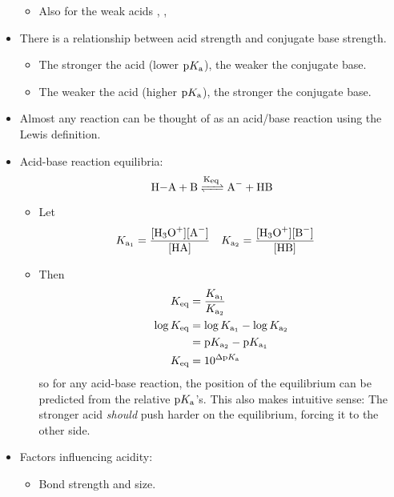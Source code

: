 \documentclass[../notes.tex]{subfiles}
\begin{document}
\begin{itemize}
    \begin{itemize}
        \item Also for the weak acids , , 
    \end{itemize}
    \item There is a relationship between acid strength and conjugate base strength.
    \begin{itemize}
        \item The stronger the acid (lower $\text{p}K_\text{a}$), the weaker the conjugate base.
        \item The weaker the acid (higher $\text{p}K_\text{a}$), the stronger the conjugate base.
    \end{itemize}
    \item Almost any reaction can be thought of as an acid/base reaction using the Lewis definition.
    \item Acid-base reaction equilibria:
    \begin{equation*}
        \ce{H-A + B <=>[K\textsubscript{eq}] A- + HB}
    \end{equation*}
    \begin{itemize}
        \item Let
        \begin{align*}
            K_{\text{a}_1} &= \frac{[\ce{H3O+}][\ce{A-}]}{[\ce{HA}]}&
            K_{\text{a}_2} &= \frac{[\ce{H3O+}][\ce{B-}]}{[\ce{HB}]}
        \end{align*}
        \item Then
        \begin{align*}
            K_\text{eq} &= \frac{K_{\text{a}_1}}{K_{\text{a}_2}}\\
            \log K_\text{eq} &= \log K_{\text{a}_1}-\log K_{\text{a}_2}\\
            &= \text{p}K_{\text{a}_2}-\text{p}K_{\text{a}_1}\\
            K_\text{eq} &= 10^{\Delta\text{p}K_\text{a}}
        \end{align*}
        so for any acid-base reaction, the position of the equilibrium can be predicted from the relative $\text{p}K_\text{a}$'s. This also makes intuitive sense: The stronger acid \emph{should} push harder on the equilibrium, forcing it to the other side.
    \end{itemize}
    \item Factors influencing acidity:
    \begin{itemize}
        \item Bond strength and size.
        \begin{itemize}

\end{itemize}
\end{itemize}
\end{itemize}
\end{document}
